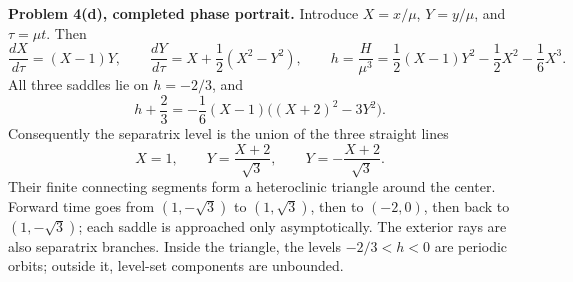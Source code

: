 \documentclass[12pt]{amsart}
\theoremstyle{plain}
\theoremstyle{definition}
\theoremstyle{definition}
\theoremstyle{plain}
\begin{document}
    \clearpage
    \noindent\textbf{Problem 4(d), completed phase portrait.}
    Introduce $X=x/\mu$, $Y=y/\mu$, and $\tau=\mu t$. Then
    \[
      \frac{dX}{d\tau}=(X-1)Y,\qquad
      \frac{dY}{d\tau}=X+\frac12(X^2-Y^2),\qquad
      h=\frac{H}{\mu^3}=\frac12(X-1)Y^2-\frac12X^2-\frac16X^3.
    \]
    All three saddles lie on $h=-2/3$, and
    \[
      h+\frac23=-\frac16(X-1)\bigl((X+2)^2-3Y^2\bigr).
    \]
    Consequently the separatrix level is the union of the three straight lines
    \[
      \boxed{X=1,\qquad Y=\frac{X+2}{\sqrt3},\qquad
             Y=-\frac{X+2}{\sqrt3}.}
    \]
    Their finite connecting segments form a heteroclinic triangle around
    the center. Forward time goes from $(1,-\sqrt3)$ to $(1,\sqrt3)$,
    then to $(-2,0)$, then back to $(1,-\sqrt3)$; each saddle is approached
    only asymptotically. The exterior rays are also separatrix branches.
    Inside the triangle, the levels $-2/3<h<0$ are periodic orbits;
    outside it, level-set components are unbounded.
\end{document}
